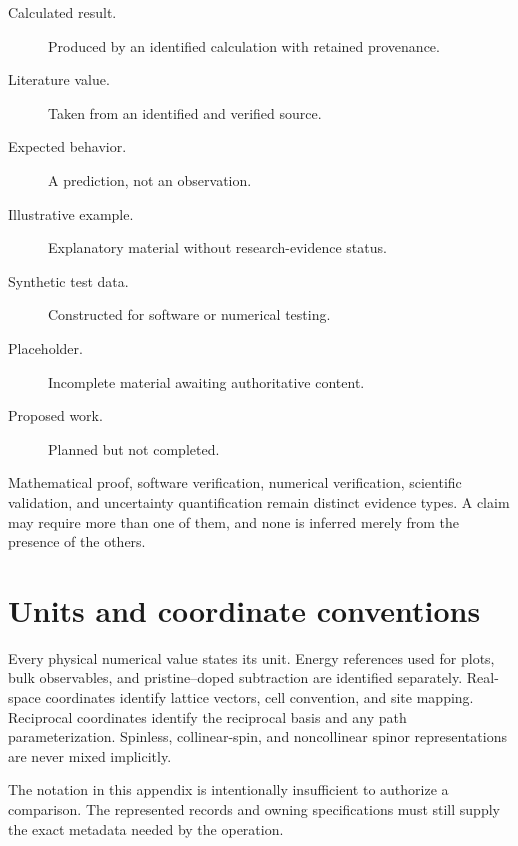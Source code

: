 \begin{description}
  \item[Calculated result.] Produced by an identified calculation with retained
    provenance.
  \item[Literature value.] Taken from an identified and verified source.
  \item[Expected behavior.] A prediction, not an observation.
  \item[Illustrative example.] Explanatory material without research-evidence
    status.
  \item[Synthetic test data.] Constructed for software or numerical testing.
  \item[Placeholder.] Incomplete material awaiting authoritative content.
  \item[Proposed work.] Planned but not completed.
\end{description}

Mathematical proof, software verification, numerical verification, scientific
validation, and uncertainty quantification remain distinct evidence types. A
claim may require more than one of them, and none is inferred merely from the
presence of the others.

\section{Units and coordinate conventions}


Every physical numerical value states its unit. Energy references used for
plots, bulk observables, and pristine--doped subtraction are identified
separately. Real-space coordinates identify lattice vectors, cell convention,
and site mapping. Reciprocal coordinates identify the reciprocal basis and any
path parameterization. Spinless, collinear-spin, and noncollinear spinor
representations are never mixed implicitly.

The notation in this appendix is intentionally insufficient to authorize a
comparison. The represented records and owning specifications must still supply
the exact metadata needed by the operation.
